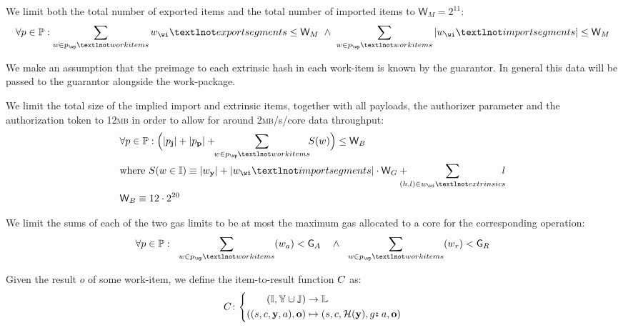 We limit both the total number of exported items and the total number of imported items to $\mathsf{W}_M = 2^{11}$:
\begin{equation}
  \forall \wpX \in \mathbb{P}:
  \sum_{\wiX \in \wpX_\wp¬workitems} \wiX_\wi¬exportsegments \le \mathsf{W}_M \ \wedge\ 
  \sum_{\wiX \in \wpX_\wp¬workitems} |\wiX_\wi¬importsegments| \le \mathsf{W}_M
\end{equation}

We make an assumption that the preimage to each extrinsic hash in each work-item is known by the guarantor. In general this data will be passed to the guarantor alongside the work-package.

We limit the total size of the implied import and extrinsic items, together with all payloads, the authorizer parameter and the authorization token to 12\textsc{mb} in order to allow for around 2\textsc{mb}/s/core data throughput:
\begin{align}
  \label{eq:checkextractsize}
  &\begin{aligned}
    &\forall \wpX \in \mathbb{P}: \Big(|p_\mathbf{j}| + |p_\mathbf{p}| +
    \!\!\sum_{\wiX \in \wpX_\wp¬workitems}\!\!S(\wiX)\Big) \le \mathsf{W}_B \\
    &\where S(\wiX \in \mathbb{I}) \equiv |\wiX_\mathbf{y}| + |\wiX_\wi¬importsegments|\cdot\mathsf{W}_G + \!\!\!\!\!\!\sum_{(h, l) \in \wiX_\wi¬extrinsics} \!\!\!l
  \end{aligned}\\
  &\mathsf{W}_B \equiv 12\cdot2^{20}
\end{align}

We limit the sums of each of the two gas limits to be at most the maximum gas allocated to a core for the corresponding operation:
\begin{equation}
  \forall \wpX \in \mathbb{P}:\ \;
    \sum_{\wiX \in \wpX_\wp¬workitems}(\wiX_a) < \mathsf{G}_A
  \quad\wedge\ \;
    \sum_{\wiX \in \wpX_\wp¬workitems}(\wiX_r) < \mathsf{G}_R
\end{equation}


Given the result $o$ of some work-item, we define the item-to-result function $C$ as:
\begin{equation}
  \itemtoresult\colon\left\{\begin{aligned}
    (\mathbb{I}, \Y \cup \mathbb{J}) &\to \mathbb{L}\\
    ((s, c, \mathbf{y}, a), \mathbf{o}) &\mapsto (s, c, \mathcal{H}(\mathbf{y}), \is{g}{a}, \mathbf{o})
  \end{aligned}\right.
\end{equation}

